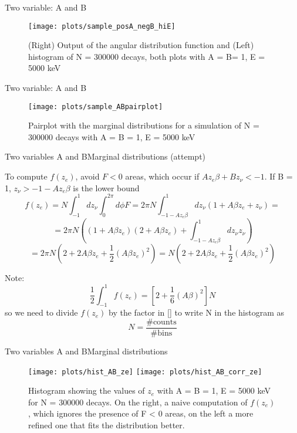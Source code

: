 \documentclass{beamer}
\begin{document}
\begin{frame}{Two variable: A and B}
	\begin{figure}
		\centering
		\texttt{[image: plots/sample\_posA\_negB\_hiE]}
		\caption{(Right) Output of the angular distribution function and (Left) histogram of N = 300000 decays, both plots with A = B= 1, E = 5000 keV}
	\end{figure}
\end{frame}
\begin{frame}{Two variable: A and B}
	\begin{figure}
		\centering
		\texttt{[image: plots/sample\_ABpairplot]}
		\caption{Pairplot with the marginal distributions for a simulation of N = 300000 decays with A = B = 1, E = 5000 keV}
	\end{figure}
\end{frame}

\begin{frame}{Two variables A and B}{Marginal distributions (attempt)}
	
	To compute $f(z_e)$, avoid $F < 0$ areas, which occur if $Az_e\beta+Bz_\nu < -1$.
	If B = 1, $z_\nu > -1-Az_e\beta$ is the lower bound 
	$$f(z_e) = N\int_{-1}^{1}dz_\nu\int_{0}^{2\pi}d\phi F = 2\pi N\int_{-1-Az_e\beta}^{1}dz_\nu(1 + A\beta z_e + z_\nu) = $$
	$$ = 2\pi N\left((1+A\beta z_e)(2+A\beta z_e)+\int^{1}_{-1-Az_e\beta}dz_\nu z_\nu\right) $$
	$$=2\pi N \left(2 + 2A\beta z_e + \frac 12 (A\beta z_e)^2 \right)=N\left(2 + 2A\beta z_e + \frac 12 (A\beta z_e)^2 \right)$$
	
	Note:
	$$\frac 12\int_{-1}^{1} f(z_e) = \left[2 + \frac{1}{6}(A\beta)^2\right]N$$
	so we need to divide $f(z_e)$ by the factor in [] to write N in the histogram as
	$$N =  \frac{\# \text{counts}}{\# \text{bins}}$$ 
	
	
	
\end{frame}

\begin{frame}{Two variables A and B}{Marginal distributions}
	\begin{figure}
		\centering
		\texttt{[image: plots/hist\_AB\_ze]}
		\texttt{[image: plots/hist\_AB\_corr\_ze]}
		\caption{Histogram showing the values of $z_e$ with A = B = 1, E = 5000 keV for N = 300000 decays. On the right, a naive computation of $f(z_e)$, which ignores the presence of F < 0 areas, on the left a more refined one that fits the distribution better.}
	\end{figure}
\end{frame}
\end{document}

